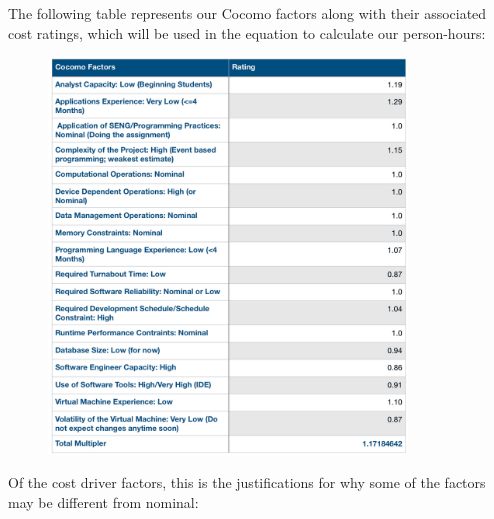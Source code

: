 \documentclass[11pt,a4paper]{article}
\begin{document}
The following table represents our Cocomo factors along with their associated cost ratings, which will be used in the equation to calculate our person-hours:

\begin{figure}[h]
\centering
      \includegraphics[width=0.85\textwidth]{cocoimg1.png}  
\end{figure}

Of the cost driver factors, this is the justifications for why some of the factors may be different from nominal:
\end{document}
